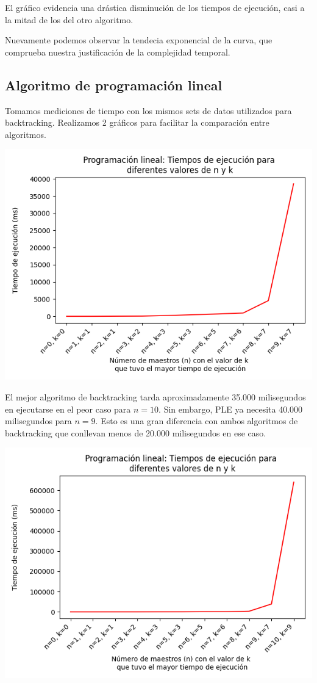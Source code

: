 \documentclass{article}
\begin{document}
El gráfico evidencia una drástica disminución de los tiempos de ejecución, casi a la mitad de los del otro algoritmo. 

Nuevamente podemos observar la tendecia exponencial de la curva, que comprueba nuestra justificación de la complejidad temporal.

\subsection{Algoritmo de programación lineal}

Tomamos mediciones de tiempo con los mismos sets de datos utilizados para backtracking. Realizamos 2 gráficos para facilitar la comparación entre algoritmos. 

\includegraphics[scale=0.60]{images/graficoProgramacionLinealSin10.png}

El mejor algoritmo de backtracking tarda aproximadamente 35.000 milisegundos en ejecutarse en el peor caso para $n = 10$. Sin embargo, PLE ya necesita 40.000 milisegundos para $n = 9$. Esto es una gran diferencia con ambos algoritmos de backtracking que conllevan menos de 20.000 milisegundos en ese caso.

\includegraphics[scale=0.60]{images/graficoProgramacionLineal.png}
\end{document}
